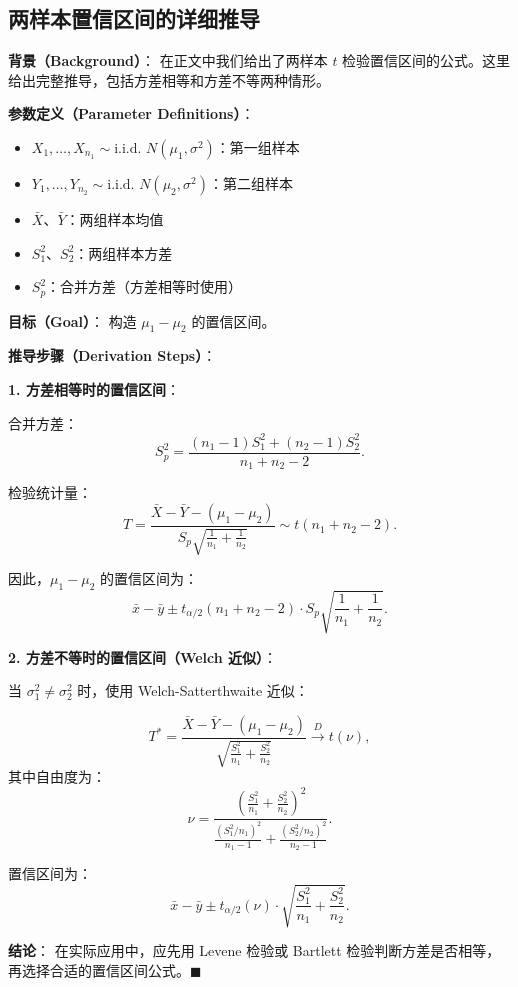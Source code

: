 \subsection{两样本置信区间的详细推导}\label{sec:derivation-two-sample-ci}

\textbf{背景（Background）}：
在正文中我们给出了两样本 $t$ 检验置信区间的公式。这里给出完整推导，包括方差相等和方差不等两种情形。

\textbf{参数定义（Parameter Definitions）}：
\begin{itemize}
\item $X_1, \ldots, X_{n_1} \sim \text{i.i.d. } N(\mu_1, \sigma^2)$：第一组样本
\item $Y_1, \ldots, Y_{n_2} \sim \text{i.i.d. } N(\mu_2, \sigma^2)$：第二组样本
\item $\bar{X}$、$\bar{Y}$：两组样本均值
\item $S_1^2$、$S_2^2$：两组样本方差
\item $S_p^2$：合并方差（方差相等时使用）
\end{itemize}

\textbf{目标（Goal）}：
构造 $\mu_1 - \mu_2$ 的置信区间。

\textbf{推导步骤（Derivation Steps）}：

\textbf{1. 方差相等时的置信区间}：

合并方差：
\[
S_p^2 = \frac{(n_1 - 1)S_1^2 + (n_2 - 1)S_2^2}{n_1 + n_2 - 2}.
\]

检验统计量：
\[
T = \frac{\bar{X} - \bar{Y} - (\mu_1 - \mu_2)}{S_p \sqrt{\frac{1}{n_1} + \frac{1}{n_2}}} \sim t(n_1 + n_2 - 2).
\]

因此，$\mu_1 - \mu_2$ 的置信区间为：
\[
\bar{x} - \bar{y} \pm t_{\alpha/2}(n_1 + n_2 - 2) \cdot S_p \sqrt{\frac{1}{n_1} + \frac{1}{n_2}}.
\]

\textbf{2. 方差不等时的置信区间（Welch 近似）}：

当 $\sigma_1^2 \neq \sigma_2^2$ 时，使用 Welch-Satterthwaite 近似：

\[
T^* = \frac{\bar{X} - \bar{Y} - (\mu_1 - \mu_2)}{\sqrt{\frac{S_1^2}{n_1} + \frac{S_2^2}{n_2}}} \xrightarrow{D} t(\nu),
\]
其中自由度为：
\[
\nu = \frac{\left(\frac{S_1^2}{n_1} + \frac{S_2^2}{n_2}\right)^2}{\frac{(S_1^2/n_1)^2}{n_1-1} + \frac{(S_2^2/n_2)^2}{n_2-1}}.
\]

置信区间为：
\[
\bar{x} - \bar{y} \pm t_{\alpha/2}(\nu) \cdot \sqrt{\frac{S_1^2}{n_1} + \frac{S_2^2}{n_2}}.
\]

\textbf{结论}：
在实际应用中，应先用 Levene 检验或 Bartlett 检验判断方差是否相等，再选择合适的置信区间公式。$\blacksquare$

